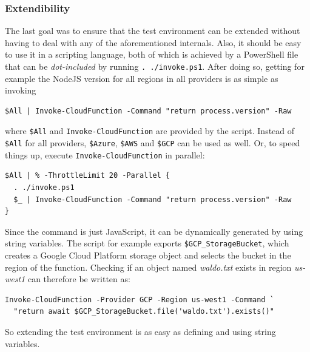 \documentclass[a4paper,bibliography=totoc]{scrartcl}
\newcommand{\GCP}{Google Cloud Platform\xspace}
\begin{document}
\subsubsection{Extendibility}
The last goal was to ensure that the test environment can be extended without having to deal with any of the aforementioned internals. Also, it should be easy to use it in a scripting language, both of which is achieved by a PowerShell file that can be \textit{dot-included} by running \texttt{. ./invoke.ps1}.\cite{wb_invoke} After doing so, getting for example the NodeJS version for all regions in all providers is as simple as invoking
\begin{verbatim}
$All | Invoke-CloudFunction -Command "return process.version" -Raw
\end{verbatim}
where \texttt{\$All} and \texttt{Invoke-CloudFunction} are provided by the script. Instead of \texttt{\$All} for all providers, \texttt{\$Azure}, \texttt{\$AWS} and \texttt{\$GCP} can be used as well. Or, to speed things up, execute \texttt{Invoke-CloudFunction} in parallel:
\begin{verbatim}
$All | % -ThrottleLimit 20 -Parallel {
  . ./invoke.ps1
  $_ | Invoke-CloudFunction -Command "return process.version" -Raw
}
\end{verbatim}
Since the command is just JavaScript, it can be dynamically generated by using string variables. The script for example exports \texttt{\$GCP\_StorageBucket}, which creates a \GCP storage object and selects the bucket in the region of the function. Checking if an object named \textit{waldo.txt} exists in region \textit{us-west1} can therefore be written as:
\begin{verbatim}
Invoke-CloudFunction -Provider GCP -Region us-west1 -Command `
  "return await $GCP_StorageBucket.file('waldo.txt').exists()"
\end{verbatim}
So extending the test environment is as easy as defining and using string variables.
\end{document}
